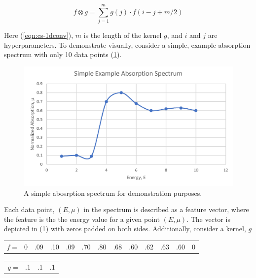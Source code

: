 \begin{equation}
    \label{eqn:cs-1dconv}
    f \otimes g = \sum_{j=1}^m g(j) \cdot  f(i-j+m/2)
\end{equation}

\noindent Here (\ref{eqn:cs-1dconv}), $ m $ is the length of the kernel $ g $, and $ i $ and $ j $ are hyperparameters. To demonstrate visually, consider a simple, example absorption spectrum with only 10 data points (\ref{fig:conv-ex-spectrum}).

\begin{figure}[h!]
    \centering
    \includegraphics[width=.75\linewidth]{Chapters/Figures/conv-example.png}
    \caption[Toy Absorption Spectrum]{A simple abosrption spectrum for demonstration purposes.}
    \label{fig:conv-ex-spectrum}
\end{figure}
 
\noindent Each data point, $ (E, \mu) $ in the spectrum is described as a feature vector, where the feature is the the energy value for a given point $ (E, \mu) $. The vector is depicted in (\ref{conv-squares}) with zeros padded on both sides. Additionally, consider a kernel, $ g $  

\begin{table}[h!]
    \centering
    \begin{tabular}{c|c|c|c|c|c|c|c|c|c|c|c|c|}
    \cline{2-13}
    \textit{f} = & 0 & .09 & .10 & .09 & .70 & .80 & .68 & .60 & .62 & .63 & .60 & 0 \\ \cline{2-13}
    \end{tabular}
    \label{conv-squares}
\end{table}

\begin{table}[h!]
\centering
    \begin{tabular}{lccc}
    \cline{2-4}
    \multicolumn{1}{l|}{\textit{g} =} & \multicolumn{1}{c|}{.1} & \multicolumn{1}{c|}{.1} & \multicolumn{1}{c|}{.1} \\ \cline{2-4}                 
    \end{tabular}
\end{table}

